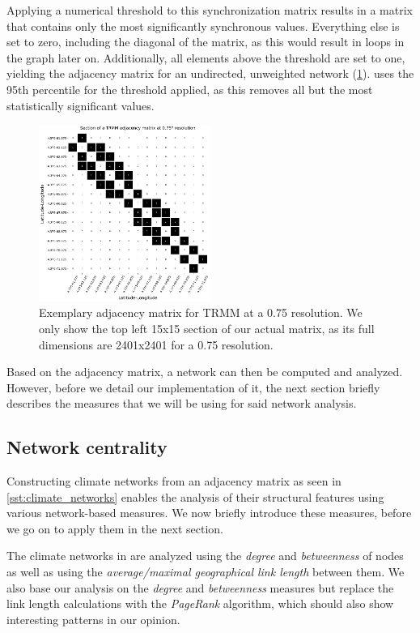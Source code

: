 Applying a numerical threshold to this synchronization matrix results in a matrix that contains only the most significantly synchronous values. Everything else is set to zero, including the diagonal of the matrix, as this would result in loops in the graph later on. Additionally, all elements above the threshold are set to one, yielding the adjacency matrix for an undirected, unweighted network (\cref{fig:adjacency_matrix}). \citet{Stolbova.2015} uses the 95th percentile for the threshold applied, as this removes all but the most statistically significant values.

\begin{figure}[h]
  \centering
  \includegraphics[width=0.5\textwidth]{./99_appendix/img/trmm_adjacency_example}
  \caption{Exemplary adjacency matrix for TRMM at a {0.75\degree} resolution. We only show the top left 15x15 section of our actual matrix, as its full dimensions are 2401x2401 for a {0.75\degree} resolution.}
  \label{fig:adjacency_matrix}
\end{figure}

Based on the adjacency matrix, a network can then be computed and analyzed. However, before we detail our implementation of it, the next section briefly describes the measures that we will be using for said network analysis.

\subsection{Network centrality}
\label{sst:network_measures}
Constructing climate networks from an adjacency matrix as seen in \cref{sst:climate_networks} enables the analysis of their structural features using various network-based measures. We now briefly introduce these measures, before we go on to apply them in the next section.

The climate networks in \citet{Stolbova.2015} are analyzed using the \textit{degree} and \textit{betweenness} of nodes as well as using the \textit{average/maximal geographical link length} between them. We also base our analysis on the \textit{degree} and \textit{betweenness} measures but replace the link length calculations with the \textit{PageRank} algorithm, which should also show interesting patterns in our opinion.

